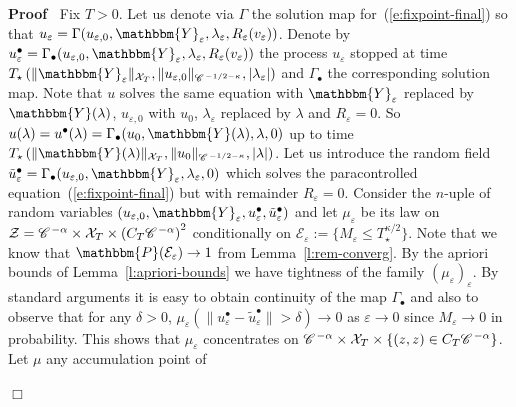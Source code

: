\documentclass[a4paper,11pt]{article}
\newcommand{\assign}{:=}
\newenvironment{proof}{\noindent\textbf{Proof\ }}{\hspace*{\fill}$\Box$\medskip}
\newcommand{\CC}{\mathscr{C} \hspace{.1em}}
\begin{document}
\begin{proof}
  Fix $T > 0$. Let us denote via $\Gamma$ the solution map
  for~(\ref{e:fixpoint-final}) so that $_{} u_{\varepsilon} = \Gamma
  (u_{\varepsilon, 0}, \mathbbm{Y}_{\varepsilon}, \lambda_{\varepsilon},
  R_{\varepsilon} (v_{\varepsilon}))$. Denote by $u_{\varepsilon}^{\bullet} =
  \Gamma_{\bullet} (u_{\varepsilon, 0}, \mathbbm{Y}_{\varepsilon},
  \lambda_{\varepsilon}, R_{\varepsilon} (v_{\varepsilon}))$ the process
  $u_{\varepsilon}$ stopped at time $T_{\star} \left( \|
  \mathbbm{Y}_{\varepsilon} \|_{\mathcal{X}_T}, \| u_{\varepsilon, 0}
  \|_{\CC^{- 1 / 2 - \kappa}}, | \lambda_{\varepsilon} | \right)$ and
  $\Gamma_{\bullet}$ the corresponding solution map. Note that $u$ solves the
  same equation with $\mathbbm{Y}_{\varepsilon}$ replaced by $\mathbbm{Y}
  (\lambda)$, $u_{\varepsilon, 0}$ with $u_0$, $\lambda_{\varepsilon}$
  replaced by $\lambda$ and $R_{\varepsilon} = 0$. So $u (\lambda) =
  u^{\bullet} (\lambda) = \Gamma_{\bullet} (u_0, \mathbbm{Y} (\lambda),
  \lambda, 0)$ up to time $T_{\star} \left( \| \mathbbm{Y} (\lambda)
  \|_{\mathcal{X}_T}, \| u_0 \|_{\CC^{- 1 / 2 - \kappa}}, | \lambda |
  \right)$. Let us introduce the random field
  $\tilde{u}_{\varepsilon}^{\bullet} = \Gamma_{\bullet} (u_{\varepsilon, 0},
  \mathbbm{Y}_{\varepsilon}, \lambda_{\varepsilon}, 0)$ which solves the
  paracontrolled equation~(\ref{e:fixpoint-final}) but with remainder
  $R_{\varepsilon} = 0$. Consider the $n$-uple of random variables
  $(u_{\varepsilon, 0}, \mathbbm{Y}_{\varepsilon}, u_{\varepsilon}^{\bullet},
  \tilde{u}_{\varepsilon}^{\bullet})$ and let $\mu_{\varepsilon}$ be its law
  on $\mathcal{Z}= \CC^{- \alpha} \times \mathcal{X}_T \times \left( C_T
  \CC^{- \alpha} \right)^2$ conditionally on $\mathcal{E}_{\varepsilon}
  \assign \{M_{\varepsilon} \leqslant T_{\star}^{\kappa / 2} \}$. Note that we
  know that $\mathbbm{P} (\mathcal{E}_{\varepsilon}) \rightarrow 1$ from
  Lemma~\ref{l:rem-converg}. By the apriori bounds of
  Lemma~\ref{l:apriori-bounds} we have tightness of the family
  $(\mu_{\varepsilon})_{\varepsilon}$. By standard arguments it is easy to
  obtain continuity of the map $\Gamma_{\bullet}$ and also to observe that for
  any $\delta > 0$, $\mu_{\varepsilon} (\| u_{\varepsilon}^{\bullet} -
  \tilde{u}_{\varepsilon}^{\bullet} \| > \delta) \rightarrow 0$ as
  $\varepsilon \rightarrow 0$ since $M_{\varepsilon} \rightarrow 0$ in
  probability. This shows that $\mu_{\varepsilon}$ concentrates on $\CC^{-
  \alpha} \times \mathcal{X}_T \times \left\{ (z, z) \in C_T \CC^{- \alpha}
  \right\}$. Let $\mu$ any accumulation point of

\end{proof}
\end{document}
